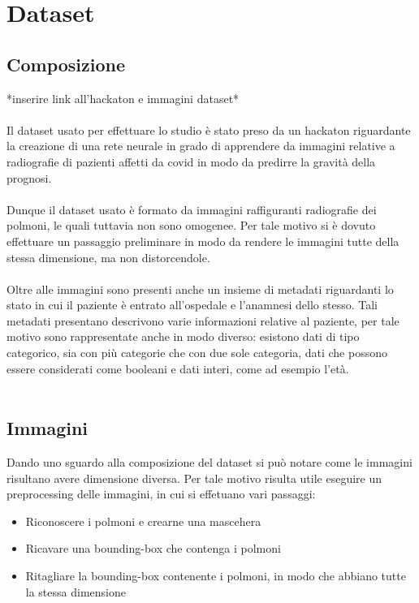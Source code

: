 \chapter{Dataset}
\label{ch:Dataset}
\section{Composizione}
*inserire link all'hackaton e immagini dataset*
\\\\
Il dataset usato per effettuare lo studio è stato preso da un hackaton riguardante la creazione di una rete neurale in grado di apprendere 
da immagini relative a radiografie di pazienti affetti da covid in modo da predirre la gravità della prognosi.
\\\\
Dunque il dataset usato è formato da immagini raffiguranti radiografie dei polmoni, le quali tuttavia non sono omogenee. Per tale motivo 
si è dovuto effettuare un passaggio preliminare in modo da rendere le immagini tutte della stessa dimensione, ma non distorcendole.
\\\\
Oltre alle immagini sono presenti anche un insieme di metadati riguardanti lo stato in cui il paziente è entrato all'ospedale e l'anamnesi dello stesso.
Tali metadati presentano descrivono varie informazioni relative al paziente, per tale motivo sono rappresentate anche in modo diverso: esistono dati di tipo categorico, sia con più categorie che con
due sole categoria, dati che possono essere considerati come booleani e dati interi, come ad esempio l'età.
\\\\
\section{Immagini}
Dando uno sguardo alla composizione del dataset si può notare come le immagini risultano avere dimensione diversa. Per tale motivo 
risulta utile eseguire un preprocessing delle immagini, in cui si effetuano vari passaggi:
\begin{itemize}
    \item Riconoscere i polmoni e crearne una mascehera
    \item Ricavare una bounding-box che contenga i polmoni
    \item Ritagliare la bounding-box contenente i polmoni, in modo che abbiano tutte la stessa dimensione
\end{itemize}

